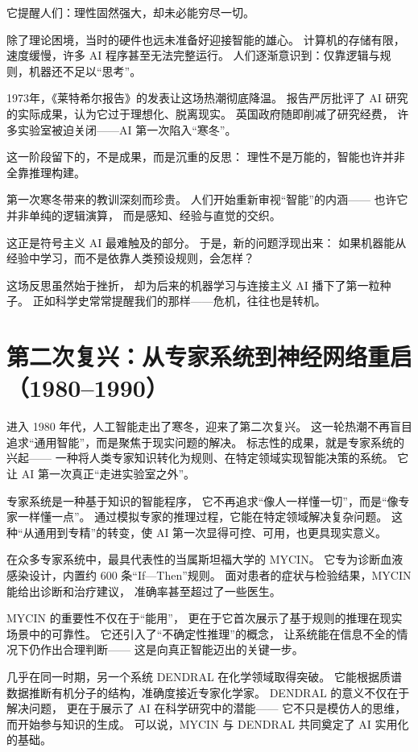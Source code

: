 它提醒人们：理性固然强大，却未必能穷尽一切。

除了理论困境，当时的硬件也远未准备好迎接智能的雄心。
计算机的存储有限，速度缓慢，许多 AI 程序甚至无法完整运行。
人们逐渐意识到：仅靠逻辑与规则，机器还不足以“思考”。

1973年，《莱特希尔报告》的发表让这场热潮彻底降温。
报告严厉批评了 AI 研究的实际成果，认为它过于理想化、脱离现实。
英国政府随即削减了研究经费，
许多实验室被迫关闭——AI 第一次陷入“寒冬”。

这一阶段留下的，不是成果，而是沉重的反思：
理性不是万能的，智能也许并非全靠推理构建。

第一次寒冬带来的教训深刻而珍贵。
人们开始重新审视“智能”的内涵——
也许它并非单纯的逻辑演算，
而是感知、经验与直觉的交织。

这正是符号主义 AI 最难触及的部分。
于是，新的问题浮现出来：
如果机器能从经验中学习，而不是依靠人类预设规则，会怎样？

这场反思虽然始于挫折，
却为后来的机器学习与连接主义 AI 播下了第一粒种子。
正如科学史常常提醒我们的那样——危机，往往也是转机。

\section{第二次复兴：从专家系统到神经网络重启（1980–1990）}

进入 1980 年代，人工智能走出了寒冬，迎来了第二次复兴。  
这一轮热潮不再盲目追求“通用智能”，而是聚焦于现实问题的解决。  
标志性的成果，就是专家系统的兴起——  
一种将人类专家知识转化为规则、在特定领域实现智能决策的系统。  
它让 AI 第一次真正“走进实验室之外”。  

专家系统是一种基于知识的智能程序，  
它不再追求“像人一样懂一切”，而是“像专家一样懂一点”。  
通过模拟专家的推理过程，它能在特定领域解决复杂问题。  
这种“从通用到专精”的转变，使 AI 第一次显得可控、可用，也更具现实意义。  

在众多专家系统中，最具代表性的当属斯坦福大学的 MYCIN。  
它专为诊断血液感染设计，内置约 600 条“If—Then”规则。  
面对患者的症状与检验结果，MYCIN 能给出诊断和治疗建议，  
准确率甚至超过了一些医生。  

MYCIN 的重要性不仅在于“能用”，  
更在于它首次展示了基于规则的推理在现实场景中的可靠性。  
它还引入了“不确定性推理”的概念，  
让系统能在信息不全的情况下仍作出合理判断——  
这是向真正智能迈出的关键一步。  

几乎在同一时期，另一个系统 DENDRAL 在化学领域取得突破。  
它能根据质谱数据推断有机分子的结构，准确度接近专家化学家。  
DENDRAL 的意义不仅在于解决问题，  
更在于展示了  AI  在科学研究中的潜能——  
它不只是模仿人的思维，而开始参与知识的生成。  
可以说，MYCIN 与 DENDRAL 共同奠定了  AI  实用化的基础。  

